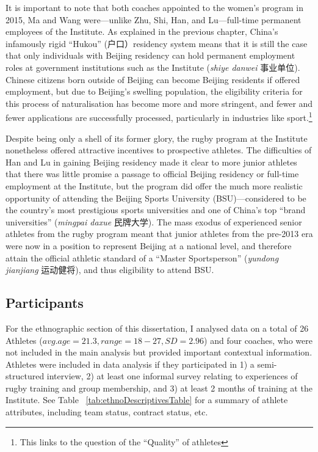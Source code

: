 \begin{CJK}{UTF8}{gbsn}
  It is important to note that both coaches appointed to the women's program in 2015, Ma and Wang were---unlike Zhu, Shi, Han, and Lu---full-time permanent employees of the Institute. As explained in the previous chapter, China's infamously rigid ``Hukou'' (户口）residency system means that it is still the case that only individuals with Beijing residency can hold permanent employment roles at government institutions such as the Institute (\textit{shiye danwei} 事业单位).  Chinese citizens born outside of Beijing can become Beijing residents if offered employment, but due to Beijing's swelling population, the eligibility criteria for this process of naturalisation has become more and more stringent, and fewer and fewer applications are successfully processed, particularly in industries like sport.\footnote{This links to the question of the ``Quality'' of athletes}

  Despite being only a shell of its former glory, the rugby program at the Institute nonetheless offered attractive incentives to prospective athletes.  The difficulties of Han and Lu in gaining Beijing residency made it clear to more junior athletes that there was little promise a passage to official Beijing residency or full-time employment at the Institute, but the program did offer the much more realistic opportunity of attending the Beijing Sports University (BSU)---considered to be the country's most prestigious sports universities and one of China's top ``brand universities'' (\textit{mingpai daxue} 民牌大学).  The mass exodus of experienced senior athletes from the rugby program meant that junior athletes from the pre-2013 era were now in a position to represent Beijing at a national level, and therefore attain the official athletic standard of a ``Master Sportsperson'' (\textit{yundong jianjiang} 运动健将), and thus eligibility to attend BSU.


  \subsection{Participants}
  For the ethnographic section of this dissertation, I analysed data on a total of 26 Athletes ($avg. age = 21.3, range = 18-27, SD = 2.96$) and four coaches, who were not included in the main analysis but provided important contextual information.  Athletes were included in data analysis if they participated in 1) a semi-structured interview, 2) at least one informal survey relating to experiences of rugby training and group membership, and 3) at least 2 months of training at the Institute.  See Table ~\ref{tab:ethnoDescriptivesTable} for a summary of athlete attributes, including team status, contract status, etc.


\end{CJK}
